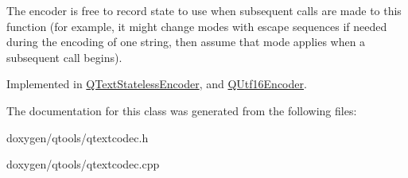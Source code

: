 The encoder is free to record state to use when subsequent calls are made to this function (for example, it might change modes with escape sequences if needed during the encoding of one string, then assume that mode applies when a subsequent call begins). 

Implemented in \mbox{\hyperlink{class_q_text_stateless_encoder_a8466950847e702e588d182a582ba660f}{Q\+Text\+Stateless\+Encoder}}, and \mbox{\hyperlink{class_q_utf16_encoder_abe6f23ccae2a17021d4906e9f5e76ae6}{Q\+Utf16\+Encoder}}.



The documentation for this class was generated from the following files\+:\begin{DoxyCompactItemize}
\item 
doxygen/qtools/qtextcodec.\+h\item 
doxygen/qtools/qtextcodec.\+cpp\end{DoxyCompactItemize}
